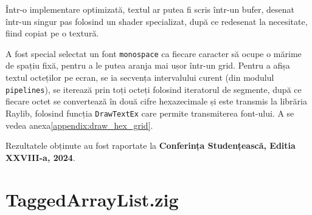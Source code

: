 \documentclass[a4paper,12pt]{report}
\newcommand{\conferencesList}{Conferința Studențească, Editia XXVIII-a, 2024}
\begin{document}
Într-o implementare optimizată, textul ar putea fi scris într-un bufer,
desenat într-un singur pas folosind un shader specializat,
după ce redesenat la necesitate, fiind copiat pe o textură.

A fost special selectat un font \texttt{monospace} ca fiecare caracter să ocupe o mărime de spațiu fixă,
pentru a le putea aranja mai ușor într-un grid.
Pentru a afișa textul octeților pe ecran, se ia secvența intervalului curent (din modulul \texttt{pipelines}),
se iterează prin toți octeți folosind iteratorul de segmente,
după ce fiecare octet se convertează în două cifre hexazecimale și este transmis la librăria Raylib,
folosind funcția \texttt{DrawTextEx} care permite transmiterea font-ului.
A se vedea anexa\ref{appendix:draw_hex_grid}.




Rezultatele obținute au fost raportate la \textbf{\conferencesList}.

\newpage
{}





\appendix

\renewcommand{\thesection}{\arabic{section}}
\titleformat{\section}[block]{\normalfont\normalsize\bfseries\filcenter}{Anexa \thesection~}{0pt}{}


\setcounter{chapter}{1}



\section{TaggedArrayList.zig}\label{appendix:main__TaggedArrayList}
\inputminted{zig}{../src/TaggedArrayList.zig}
\end{document}

